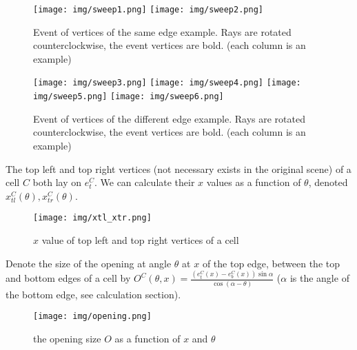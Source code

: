 \documentclass[a4paper,12pt]{extarticle}
\begin{document}
\begin{figure}[h]
    \centering
    \texttt{[image: img/sweep1.png]}
    \texttt{[image: img/sweep2.png]}
    \caption{Event of vertices of the same edge example. Rays are rotated counterclockwise, the event vertices are bold. (each column is an example)}
\end{figure}
\begin{figure}[h]
    \centering
    \texttt{[image: img/sweep3.png]}
    \texttt{[image: img/sweep4.png]}
    \texttt{[image: img/sweep5.png]}
    \texttt{[image: img/sweep6.png]}
    \caption{Event of vertices of the different edge example. Rays are rotated counterclockwise, the event vertices are bold. (each column is an example)}
\end{figure}

The top left and top right vertices (not necessary exists in the original scene) of a cell $C$ both lay on $e^{C}_{t}$. We can calculate their $x$ values as a function of $\theta$, denoted $x^{C}_{tl}(\theta),x^{C}_{tr}(\theta)$.

\begin{figure}[h]
    \centering
    \texttt{[image: img/xtl\_xtr.png]}
    \caption{$x$ value of top left and top right vertices of a cell}
\end{figure}

Denote the size of the opening at angle $\theta$ at $x$ of the top edge, between the top and bottom edges of a cell by $O^{C}(\theta,x)=\frac{(e^{C}_{t}(x)-e^{C}_{b}(x)) \sin \alpha}{\cos (\alpha - \theta)}$ ($\alpha$ is the angle of the bottom edge, see calculation section).

\begin{figure}[h] \begin{center}
    \texttt{[image: img/opening.png]}
    \caption{the opening size $O$ as a function of $x$ and $\theta$}
\end{center} \end{figure}
\end{document}
